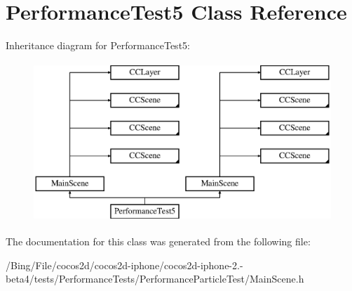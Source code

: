 \hypertarget{interface_performance_test5}{\section{Performance\-Test5 Class Reference}
\label{interface_performance_test5}
}
Inheritance diagram for Performance\-Test5\-:\begin{figure}[H]
\begin{center}
\leavevmode
\includegraphics[height=6.000000cm]{interface_performance_test5}
\end{center}
\end{figure}


The documentation for this class was generated from the following file\-:\begin{DoxyCompactItemize}
\item 
/\-Bing/\-File/cocos2d/cocos2d-\/iphone/cocos2d-\/iphone-\/2.-\/beta4/tests/\-Performance\-Tests/\-Performance\-Particle\-Test/Main\-Scene.\-h\end{DoxyCompactItemize}

